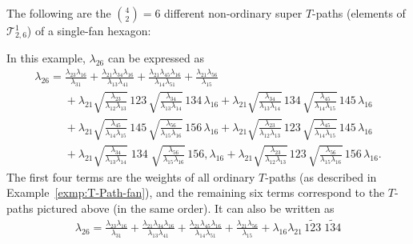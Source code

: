 \begin{Example}\label{exmp:super-T-path-fan}\rm \allowdisplaybreaks
 The following are the ${4 \choose 2}=6$ different non-ordinary super $T$-paths (elements of $\mathcal{T}^1_{2,6}$) of a single-fan hexagon:
\begin{center}

\end{center}
In this example, $\lambda_{26}$ can be expressed as
 \begin{gather*}
 \lambda_{26} = \frac{\lambda_{23}\lambda_{16}}{\lambda_{31}}
 + \frac{\lambda_{21}\lambda_{34}\lambda_{16}}{\lambda_{13}\lambda_{41}}
 + \frac{\lambda_{21}\lambda_{45}\lambda_{16}}{\lambda_{14}\lambda_{51}}
 + \frac{\lambda_{21}\lambda_{56}}{\lambda_{15}} \\
 \phantom{\lambda_{26}=} + \lambda_{21} \sqrt{\frac{\lambda_{23}}{\lambda_{12}\lambda_{13}}} \, \boxed{123} \, \sqrt{\frac{\lambda_{34}}{\lambda_{13}\lambda_{14}}} \, \boxed{134} \, \lambda_{16}
+ \lambda_{21} \sqrt{\frac{\lambda_{34}}{\lambda_{13}\lambda_{14}}} \, \boxed{134} \, \sqrt{\frac{\lambda_{45}}{\lambda_{14}\lambda_{15}}} \, \boxed{145} \, \lambda_{16} \\
 \phantom{\lambda_{26}=} + \lambda_{21} \sqrt{\frac{\lambda_{45}}{\lambda_{14}\lambda_{15}}} \, \boxed{145} \, \sqrt{\frac{\lambda_{56}}{\lambda_{15}\lambda_{16}}} \, \boxed{156} \, \lambda_{16}
+ \lambda_{21} \sqrt{\frac{\lambda_{23}}{\lambda_{12}\lambda_{13}}} \, \boxed{123} \, \sqrt{\frac{\lambda_{45}}{\lambda_{14}\lambda_{15}}} \, \boxed{145} \, \lambda_{16} \\
 \phantom{\lambda_{26}=} + \lambda_{21} \sqrt{\frac{\lambda_{34}}{\lambda_{13}\lambda_{14}}} \; \boxed{134} \; \sqrt{\frac{\lambda_{56}}{\lambda_{15}\lambda_{16}}} \, \boxed{156} , \lambda_{16}
+ \lambda_{21} \sqrt{\frac{\lambda_{23}}{\lambda_{12}\lambda_{13}}} \, \boxed{123} \, \sqrt{\frac{\lambda_{56}}{\lambda_{15}\lambda_{16}}} \, \boxed{156} \, \lambda_{16}.
 \end{gather*}
 The first four terms are the weights of all ordinary $T$-paths (as described in Example~\ref{exmp:T-Path-fan}),
 and the remaining six terms correspond to the $T$-paths pictured above (in the same order).
 It can also be written as
 \begin{gather*}
 \lambda_{26} = \frac{\lambda_{23}\lambda_{16}}{\lambda_{31}}
 + \frac{\lambda_{21}\lambda_{34}\lambda_{16}}{\lambda_{13}\lambda_{41}}
 + \frac{\lambda_{21}\lambda_{45}\lambda_{16}}{\lambda_{14}\lambda_{51}}
 + \frac{\lambda_{21}\lambda_{56}}{\lambda_{15}}
 + \lambda_{16}\lambda_{21} \, \widetilde{\boxed{123}} \; \widetilde{\boxed{134}}

\end{gather*}
\end{Example}
